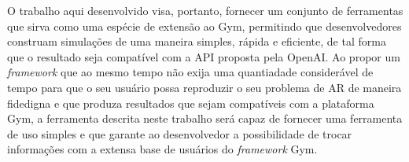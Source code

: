 \documentclass[cic,tc]{iiufrgs}
\newcommand\bruno[1]{\textcolor{magenta}{#1}}
\begin{document}
O trabalho aqui desenvolvido visa, portanto, fornecer um conjunto de ferramentas que sirva como uma espécie de extensão ao Gym, permitindo que desenvolvedores
construam simulações de uma maneira simples, rápida e eficiente, de tal forma que o resultado seja compatível com a API proposta pela OpenAI. Ao propor um
\textit{framework} que ao mesmo tempo não exija uma quantiadade considerável de tempo para que o seu usuário possa reproduzir o seu problema de AR de
maneira fidedigna e que produza resultados que sejam compatíveis com a plataforma Gym, a ferramenta descrita neste trabalho será capaz de fornecer uma
ferramenta de uso simples e que garante ao desenvolvedor a possibilidade de trocar informações com a extensa base de usuários do \textit{framework} Gym.

%
\end{document}
